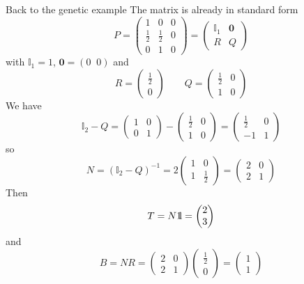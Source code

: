 \documentclass[aspectratio=169]{beamer}
\begin{document}
\begin{frame}{Back to the genetic example}
The matrix is already in standard form
\[
P=\left (
\begin{array}{ccc}
1 & 0 & 0 \\
\frac 12 & \frac 12 & 0 \\
0 & 1 & 0
\end{array}\right)
=\begin{pmatrix}
\mathbb{I}_1 & \mathbf{0} \\
R & Q
\end{pmatrix}
\]
with $\mathbb{I}_1=1$, $\mathbf{0}=(0\;\; 0)$ and
\[
R=\begin{pmatrix}
\frac 12\\ 0
\end{pmatrix}
\qquad
Q=\begin{pmatrix}
\frac 12 & 0\\
1 & 0
\end{pmatrix}
\]
We have
\[
\mathbb{I}_2-Q=\begin{pmatrix}
1 & 0 \\
0 & 1
\end{pmatrix}
-\begin{pmatrix}
\frac 12 & 0\\
1 & 0
\end{pmatrix}
=\begin{pmatrix}
\frac 12 & 0\\
-1 & 1
\end{pmatrix}
\]
so
\[
N=(\mathbb{I}_2-Q)^{-1}=
2\begin{pmatrix}
1 & 0 \\
1 & \frac 12
\end{pmatrix}=
\begin{pmatrix}
2 & 0 \\
2 & 1
\end{pmatrix}
\]
Then
\[
T=N\nbOne=\begin{pmatrix}
2\\
3
\end{pmatrix}
\]
and
\[
B=NR=
\begin{pmatrix}
2 & 0 \\
2 & 1
\end{pmatrix}
\begin{pmatrix}
\frac 12\\ 0
\end{pmatrix}
=
\begin{pmatrix}
1\\ 1
\end{pmatrix}
\]
\end{frame}
\end{document}
